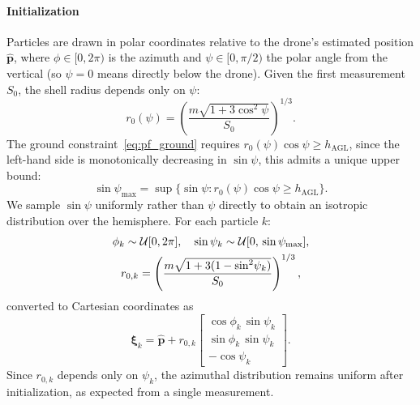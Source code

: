 \documentclass[journal,10pt,twocolumn]{IEEEtran}
\begin{document}
\paragraph{Initialization}
Particles are drawn in polar coordinates relative to the drone's
estimated position $\hat{\mathbf{p}}$, where $\phi\in[0,2\pi)$ is the
azimuth and $\psi\in[0,\pi/2)$ the polar angle from the vertical
(so $\psi=0$ means directly below the drone).  Given the first
measurement $S_0$, the shell radius depends only on $\psi$:
\begin{equation}
  r_0(\psi) = \left(\frac{m\sqrt{1+3\cos^2\!\psi}}{S_0}\right)^{1/3}.
  \label{eq:pf_r0}
\end{equation}
The ground constraint~\eqref{eq:pf_ground} requires $r_0(\psi)\cos\psi
\geq h_{\text{AGL}}$, since the left-hand side is monotonically
decreasing in $\sin\psi$, this admits a unique upper bound:
\begin{equation}
  \sin\psi_{\max} = \sup\bigl\{\sin\psi :
  r_0(\psi)\cos\psi \geq h_{\text{AGL}}\bigr\}.
  \label{eq:sinpsimax}
\end{equation}
We sample $\sin\psi$ uniformly
rather than $\psi$ directly to obtain an isotropic distribution over
the hemisphere.  For each particle $k$:
\begin{gather}
  \phi_k \sim \mathcal{U}[0, 2\pi],\quad
  \sin\psi_k \sim \mathcal{U}[0,\,\sin\psi_{\max}],\notag\\
  r_{0,k} = \left(\frac{m\sqrt{1+3(1-\sin^2\!\psi_k)}}{S_0}\right)^{1/3},
  \label{eq:pf_init_polar}
\end{gather}
converted to Cartesian coordinates as
\begin{equation}
  \bm{\xi}_k = \hat{\mathbf{p}} + r_{0,k}
  \begin{bmatrix} \cos\phi_k\,\sin\psi_k \\ \sin\phi_k\,\sin\psi_k \\
  -\cos\psi_k \end{bmatrix}.
  \label{eq:pf_init_cart}
\end{equation}
Since $r_{0,k}$ depends only on $\psi_k$, the azimuthal distribution
remains uniform after initialization, as expected from a single measurement.
\end{document}
